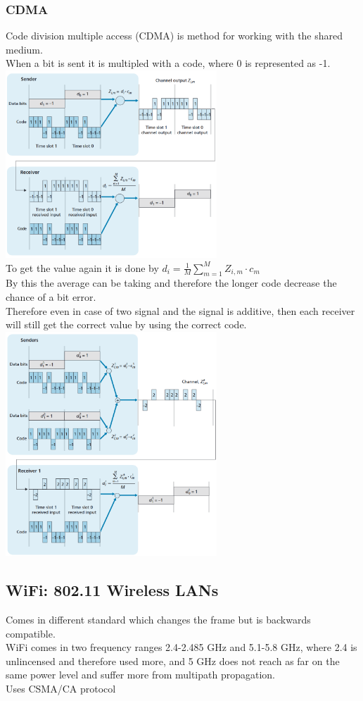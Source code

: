 \documentclass[12pt, a4paper]{article}
\begin{document}
			\subsubsection{CDMA}
				Code division multiple access (CDMA) is method for working with the shared medium.\\
				When a bit is sent it is multipled with a code, where 0 is represented as -1.\\
				\includegraphics[width=300px]{assets/CDMA.png}\\
				To get the value again it is done by $d_i=\frac{1}{M}\sum\limits_{m=1}^MZ_{i,m}\cdot c_m$\\
				By this the average can be taking and therefore the longer code decrease the chance of a bit error.\\
				Therefore even in case of two signal and the signal is additive, then each receiver will still get the correct value by using the correct code.\\
				\includegraphics[width=300px]{assets/CDMAInter.png}\\
		\subsection{WiFi: 802.11 Wireless LANs}
			Comes in different standard which changes the frame but is backwards compatible.\\
			WiFi comes in two frequency ranges 2.4-2.485 GHz and 5.1-5.8 GHz, where 2.4 is unlincensed and therefore used more, and 5 GHz does not reach as far on the same power level and suffer more from multipath propagation.\\
			Uses CSMA/CA protocol
\end{document}
